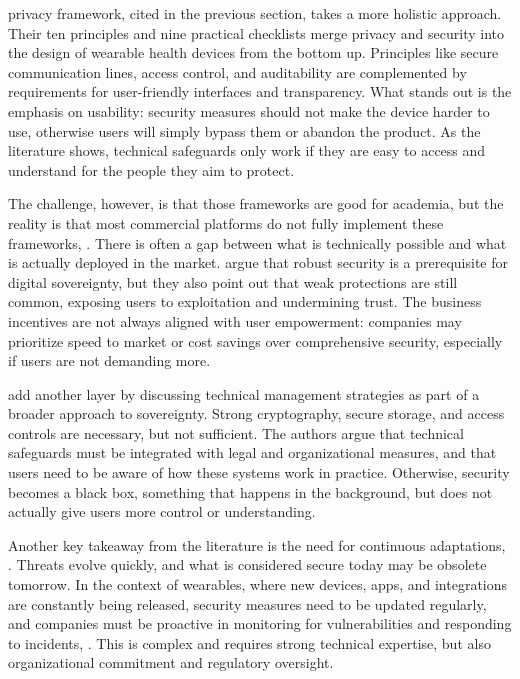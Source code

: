 	\cite{Safavi2014} privacy framework, cited in the previous section, takes a more holistic approach. Their ten principles and nine practical checklists merge privacy and security into the design of wearable health devices from the bottom up. Principles like secure communication lines, access control, and auditability are complemented by requirements for user-friendly interfaces and transparency. What stands out is the emphasis on usability: security measures should not make the device harder to use, otherwise users will simply bypass them or abandon the product. As the literature shows, technical safeguards only work if they are easy to access and understand for the people they aim to protect.

	The challenge, however, is that those frameworks are good for academia, but the reality is that most commercial platforms do not fully implement these frameworks, \cite{Arbanas2023}. There is often a gap between what is technically possible and what is actually deployed in the market. \cite{Conradie2022} argue that robust security is a prerequisite for digital sovereignty, but they also point out that weak protections are still common, exposing users to exploitation and undermining trust. The business incentives are not always aligned with user empowerment: companies may prioritize speed to market or cost savings over comprehensive security, especially if users are not demanding more.

	\cite{Hummel2021} add another layer by discussing technical management strategies as part of a broader approach to sovereignty. Strong cryptography, secure storage, and access controls are necessary, but not sufficient. The authors argue that technical safeguards must be integrated with legal and organizational measures, and that users need to be aware of how these systems work in practice. Otherwise, security becomes a black box, something that happens in the background, but does not actually give users more control or understanding.

	Another key takeaway from the literature is the need for continuous adaptations, \cite{Bouderhem2023}. Threats evolve quickly, and what is considered secure today may be obsolete tomorrow. In the context of wearables, where new devices, apps, and integrations are constantly being released, security measures need to be updated regularly, and companies must be proactive in monitoring for vulnerabilities and responding to incidents, \cite{Mone2023}. This is complex and requires strong technical expertise, but also organizational commitment and regulatory oversight.

